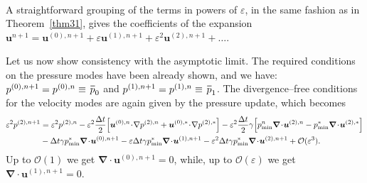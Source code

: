 \documentclass[A4paper,12pt,twoside]{article}
\newenvironment{proof}{{\flushleft \bf Proof:}}{}
\numberwithin{equation}{section}
\numberwithin{figure}{section}
\numberwithin{table}{section}
\def\bnabla{\bm{\nabla}}
\newcommand{\dt}{\Delta t}
\newcommand{\ve}{\varepsilon}
\newcommand*\xbar[1]{%
  \hbox{%
    \vbox{%
      \hrule height 0.5pt %
      \kern0.4ex%
      \hbox{%
        \kern-0.05em%
        \ensuremath{#1}%
        \kern-0.00em%
      }%
    }%
  }%
}
\begin{document}
\begin{proof}
$$\begin{aligned}
\end{aligned}$$
A straightforward grouping of the terms in powers of $\ve$, in the same fashion as in Theorem~\ref{thm31}, gives the coefficients of the expansion $\bm u^{n+1}=\bm u^{(0),n+1}+\ve\bm u^{(1),n+1}+\ve^2\bm u^{(2),n+1}+\dots$.

Let us now show consistency with the asymptotic limit.
%
The required conditions on the pressure modes have been already shown, and we have: $p^{(0),n+1}=p^{(0),n}\equiv\,\xbar p_0$ and $p^{(1),n+1}=p^{(1),n}\equiv\,\xbar p_1$.
%
The divergence--free conditions for the velocity modes are again given by the pressure update, which becomes
$$\begin{aligned}
	\ve^2 p^{(2),n+1}&=\ve^2 p^{(2),n}-\ve^2 \frac{\dt}{2} \Big[\bm u^{(0),n}\!\cdot\!\nabla p^{(2),n}+ \bm u^{(0),*}\!\cdot\!\nabla p^{(2),*}\Big]-\ve^2 \frac{\dt}{2} \gamma \Big[ p_{\min}^n\bnabla\!\cdot\!\bm u^{(2),n} - p_{\min}^*\bnabla\!\cdot\!\bm u^{(2),*}\Big]\\
	&-\dt\gamma p_{\min}^*\bnabla\!\cdot\!\bm u^{(0),n+1}-\ve \dt\gamma p_{\min}^*\bnabla\!\cdot\!\bm u^{(1),n+1}
	-\ve^2 \dt\gamma p_{\min}^*\bnabla\!\cdot\!\bm u^{(2),n+1}+{\cal O}(\ve^3).\label{3.26}
\end{aligned}$$
Up to $\mathcal{O}(1)$ we get $\bnabla\!\cdot\!\bm u^{(0),n+1}=0$, while, up to $\mathcal{O}(\ve)$ we get $\bnabla\!\cdot\!\bm u^{(1),n+1}=0$.


\end{proof}
\end{document}
